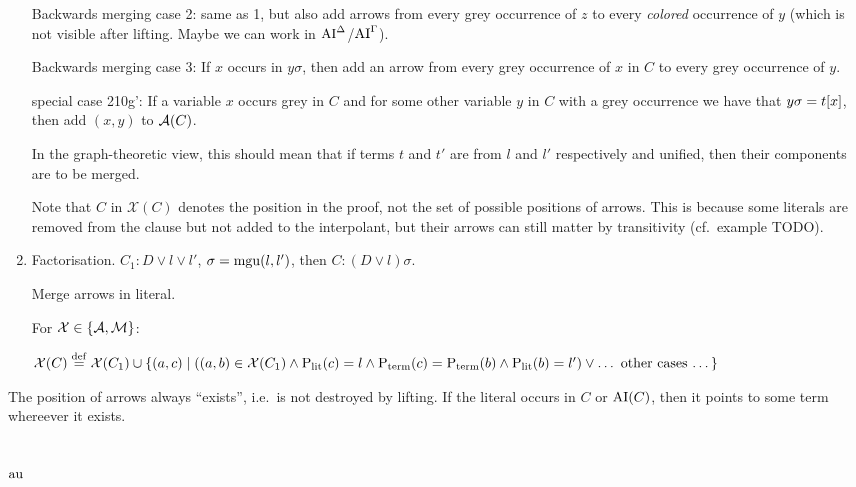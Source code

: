 \documentclass[,%
	paper=a4,%
	DIV14, %
	twoside=false,%
	liststotoc,
	bibtotoc,
	draft=false,%
	numbers=noendperiod
]{scrartcl}
\begin{document}
\begin{enumerate}
		Backwards merging case 2: 
		same as 1, but also add arrows from every grey occurrence of $z$ to every \emph{colored} occurrence of $y$ (which is not visible after lifting. Maybe we can work in $\operatorname{AI}^\Delta$/$\operatorname{AI}^\Gamma$).

		Backwards merging case 3: 
		If $x$ occurs in $y\sigma$, then add an arrow from every grey occurrence of $x$ in $C$ to every grey occurrence of $y$.

		special case 210g':
		If a variable $x$ occurs grey in $C$ and for some other variable $y$ in $C$ with a grey occurrence we have that $y\sigma = t[x]$, then add $(x, y)$ to $\operatorname{\mathcal{A}}(C)$.
		
	

		In the graph-theoretic view, this should mean that if terms $t$ and $t'$ are from $l$ and $l'$ respectively and unified, then their components are to be merged.

		Note that $C$ in $\mathcal{X}(C)$ denotes the position in the proof, not the set of possible positions of arrows.
		This is because some literals are removed from the clause but not added to the interpolant, but their arrows can still matter by transitivity (cf.~example TODO).

	\item Factorisation. $C_1: D \lor l \lor l'$, $\sigma = \operatorname{mgu}(l, l')$, then $C: (D\lor l)\sigma$.

		Merge arrows in literal.

		For $\mathcal{X} \in \{\operatorname{\mathcal{A}}, \operatorname{\operatorname{\mathcal{M}}}\}$:

		$\mathcal{X}(C) \stackrel{\operatorname{def}}{=} \mathcal{X}(C_1) \cup \{(a,c) \mid ((a,b)\in\mathcal{X}(C_1) \land \operatorname{\operatorname{{\operatorname P}}_\mathrm{lit}}(c) = l \land \operatorname{\operatorname{{\operatorname P}}_\mathrm{term}}(c) = \operatorname{\operatorname{{\operatorname P}}_\mathrm{term}}(b) \land \operatorname{\operatorname{{\operatorname P}}_\mathrm{lit}}(b) = l') \lor \text{\dots~other cases \dots}\}$


\end{enumerate}

\begin{conj}
	The position of arrows always ``exists'', i.e.~is not destroyed by lifting. If the literal occurs in $C$ or $\operatorname{AI}(C)$, then it points to some term whereever it exists.
\end{conj}

\subsection{$\operatorname{au}$}
\end{document}
